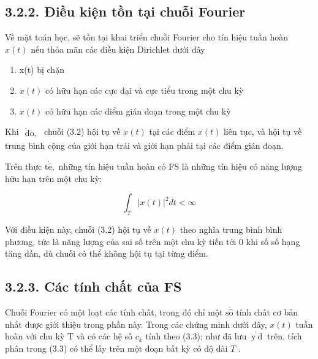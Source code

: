 \documentclass[
  10
]{article}
\begin{document}
\subsection{3.2.2. Điều kiện tồn tại chuỗi
Fourier}\label{ux111iux1ec1u-kiux1ec7n-tux1ed3n-tux1ea1i-chuux1ed7i-fourier}

Về mặt toán học, sẽ tồn tại khai triển chuỗi Fourier cho tín hiệu tuần
hoàn \(x ( t )\) nếu thỏa mãn các điều kiện Dirichlet dưới đây

\begin{enumerate}
\def\labelenumi{(\arabic{enumi})}
\item
  x(t) bị chặn
\item
  \(x ( t )\) có hữu hạn các cực đại và cực tiểu trong một chu kỳ
\item
  \(x ( t )\) có hữu hạn các điểm gián đoạn trong một chu kỳ
\end{enumerate}

Khi
\(\begin{array} { r } { \dot { \mathrm { d } } \acute { \mathrm { o } } , } \end{array}\)
chuỗi (3.2) hội tụ về \(x ( t )\) tại các điểm \(x ( t )\) liên tục, và
hội tụ về trung bình cộng của giới hạn trái và giới hạn phải tại các
điểm gián đoạn.

Trên thực \(\mathrm { t } \acute { \hat { \mathrm { e } } } ,\) những
tín hiệu tuần hoàn có FS là những tín hiệu có năng lượng hữu hạn trên
một chu kỳ:

\[
\int_ {T} | x (t) | ^ {2} d t <   \infty
\]

Với điều kiện này, chuỗi (3.2) hội tụ về \(x ( t )\) theo nghĩa trung
bình bình phương, tức là năng lượng của sai số trên một chu kỳ tiến tới
0 khi số số hạng tăng dần, dù chuỗi có thể không hội tụ tại từng điểm.

\subsection{3.2.3. Các tính chất của
FS}\label{cuxe1c-tuxednh-chux1ea5t-cux1ee7a-fs}

Chuỗi Fourier có một loạt các tính chất, trong đó chỉ một
\(\mathrm { s } \acute { \hat { \mathrm { o } } }\) tính chất cơ bản
nhất được giới thiệu trong phần này. Trong các chứng minh dưới đây,
\(x ( t )\) tuần hoàn với chu kỳ T và có các hệ số \(c _ { k }\) tính
theo (3.3); như đã lưu \(\acute { \mathrm { ~ y ~ d ~ } }\) trên, tích
phân trong (3.3) có thể lấy trên một đoạn bất kỳ có độ dài \(T\) .
\end{document}
